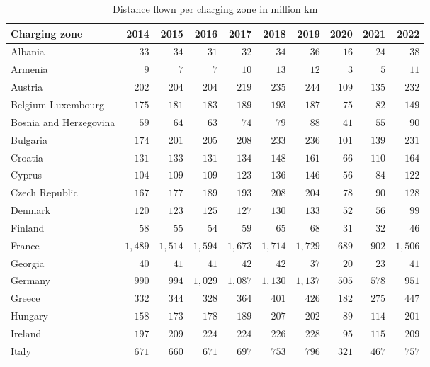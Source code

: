 \documentclass[
  11pt,
  a4paper,
]{book}
\begin{document}
\hypertarget{tbl-distance-per-charging-zone}{}
\setlength{\LTpost}{0mm}
\begin{longtable}{lrrrrrrrrr}
\caption{\label{tbl-distance-per-charging-zone}Distance flown per charging zone in million km }\tabularnewline

\toprule
Charging zone & 2014 & 2015 & 2016 & 2017 & 2018 & 2019 & 2020 & 2021 & 2022 \\ 
\midrule
Albania & $33$ & $34$ & $31$ & $32$ & $34$ & $36$ & $16$ & $24$ & $38$ \\ 
Armenia & $9$ & $7$ & $7$ & $10$ & $13$ & $12$ & $3$ & $5$ & $11$ \\ 
Austria & $202$ & $204$ & $204$ & $219$ & $235$ & $244$ & $109$ & $135$ & $232$ \\ 
Belgium-Luxembourg & $175$ & $181$ & $183$ & $189$ & $193$ & $187$ & $75$ & $82$ & $149$ \\ 
Bosnia and Herzegovina & $59$ & $64$ & $63$ & $74$ & $79$ & $88$ & $41$ & $55$ & $90$ \\ 
Bulgaria & $174$ & $201$ & $205$ & $208$ & $233$ & $236$ & $101$ & $139$ & $231$ \\ 
Croatia & $131$ & $133$ & $131$ & $134$ & $148$ & $161$ & $66$ & $110$ & $164$ \\ 
Cyprus & $104$ & $109$ & $109$ & $123$ & $136$ & $146$ & $56$ & $84$ & $122$ \\ 
Czech Republic & $167$ & $177$ & $189$ & $193$ & $208$ & $204$ & $78$ & $90$ & $128$ \\ 
Denmark & $120$ & $123$ & $125$ & $127$ & $130$ & $133$ & $52$ & $56$ & $99$ \\ 
Finland & $58$ & $55$ & $54$ & $59$ & $65$ & $68$ & $31$ & $32$ & $46$ \\ 
France & $1,489$ & $1,514$ & $1,594$ & $1,673$ & $1,714$ & $1,729$ & $689$ & $902$ & $1,506$ \\ 
Georgia & $40$ & $41$ & $41$ & $42$ & $42$ & $37$ & $20$ & $23$ & $41$ \\ 
Germany & $990$ & $994$ & $1,029$ & $1,087$ & $1,130$ & $1,137$ & $505$ & $578$ & $951$ \\ 
Greece & $332$ & $344$ & $328$ & $364$ & $401$ & $426$ & $182$ & $275$ & $447$ \\ 
Hungary & $158$ & $173$ & $178$ & $189$ & $207$ & $202$ & $89$ & $114$ & $201$ \\ 
Ireland & $197$ & $209$ & $224$ & $224$ & $226$ & $228$ & $95$ & $115$ & $209$ \\ 
Italy & $671$ & $660$ & $671$ & $697$ & $753$ & $796$ & $321$ & $467$ & $757$ \\ 

\end{longtable}
\end{document}
